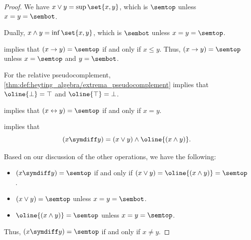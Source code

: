 \begin{proof}
   We have \( x \vee y = \sup\set{ x, y } \), which is \( \semtop \) unless \( x = y = \sembot \).

  Dually, \( x \wedge y = \inf\set{ x, y } \), which is \( \sembot \) unless \( x = y = \semtop \).

    implies that \( (x \rightarrow y) = \semtop \) if and only if \( x \leq y \). Thus, \( (x \rightarrow y) = \semtop \) unless \( x = \semtop \) and \( y = \sembot \).

  For the relative pseudocomplement, \cref{thm:def:heyting_algebra/extrema_pseudocomplement} implies that \( \oline{\bot} = \top \) and \( \oline{\top} = \bot \).

    implies that \( (x \leftrightarrow y) = \semtop \) if and only if \( x = y \).

    implies that
  \begin{equation*}
    (x \symdiff y) = (x \vee y) \wedge \oline{(x \wedge y)}.
  \end{equation*}

  Based on our discussion of the other operations, we have the following:
  \begin{itemize}
    \item \( (x \symdiff y) = \semtop \) if and only if \( (x \vee y) = \oline{(x \wedge y)} = \semtop \).
    \item \( (x \vee y) = \semtop \) unless \( x = y = \sembot \).
    \item \( \oline{(x \wedge y)} = \semtop \) unless \( x = y = \semtop \).
  \end{itemize}

  Thus, \( (x \symdiff y) = \semtop \) if and only if \( x \neq y \).
\end{proof}

